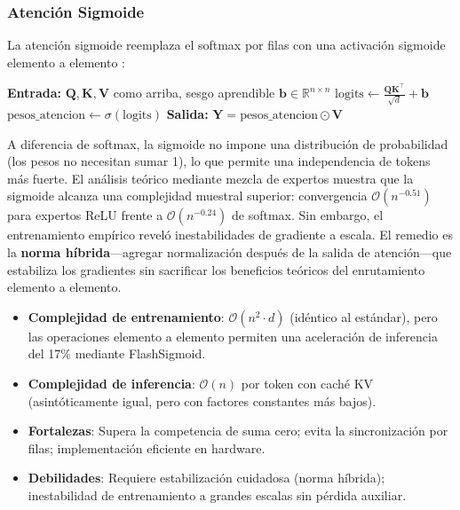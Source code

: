 \documentclass[11pt,a4paper]{article}
\begin{document}
\subsubsection{Atención Sigmoide}
La atención sigmoide reemplaza el softmax por filas con una activación sigmoide elemento a elemento \citep{ramapuram_theory_2024}:

\begin{algorithmic}[1]
\State \textbf{Entrada:} $\mathbf{Q}, \mathbf{K}, \mathbf{V}$ como arriba, sesgo aprendible $\mathbf{b} \in \mathbb{R}^{n \times n}$
\State $\text{logits} \gets \frac{\mathbf{Q}\mathbf{K}^\top}{\sqrt{d}} + \mathbf{b}$
\State $\text{pesos\_atencion} \gets \sigma(\text{logits})$ 
\State \textbf{Salida:} $\mathbf{Y} = \text{pesos\_atencion} \odot \mathbf{V}$
\end{algorithmic}

A diferencia de softmax, la sigmoide no impone una distribución de probabilidad (los pesos no necesitan sumar 1), lo que permite una independencia de tokens más fuerte. El análisis teórico mediante mezcla de expertos muestra que la sigmoide alcanza una complejidad muestral superior: convergencia $\mathcal{O}(n^{-0.51})$ para expertos ReLU frente a $\mathcal{O}(n^{-0.24})$ de softmax. Sin embargo, el entrenamiento empírico reveló inestabilidades de gradiente a escala. El remedio es la \textbf{norma híbrida}---agregar normalización después de la salida de atención---que estabiliza los gradientes sin sacrificar los beneficios teóricos del enrutamiento elemento a elemento.

\begin{itemize}[leftmargin=*]
    \item \textbf{Complejidad de entrenamiento}: $\mathcal{O}(n^2 \cdot d)$ (idéntico al estándar), pero las operaciones elemento a elemento permiten una aceleración de inferencia del 17\% mediante FlashSigmoid.
    \item \textbf{Complejidad de inferencia}: $\mathcal{O}(n)$ por token con caché KV (asintóticamente igual, pero con factores constantes más bajos).
    \item \textbf{Fortalezas}: Supera la competencia de suma cero; evita la sincronización por filas; implementación eficiente en hardware.
    \item \textbf{Debilidades}: Requiere estabilización cuidadosa (norma híbrida); inestabilidad de entrenamiento a grandes escalas sin pérdida auxiliar.
\end{itemize}
\end{document}
